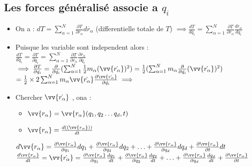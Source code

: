 \documentclass[12pt,oneside]{book}
\begin{document}
\subsection{Les forces généralisé associe a $q_i$}
\begin{small}
\begin{itemize}
	\item On a : $dT = \sum^N_{\alpha =1} \frac{\partial T}{\partial \dot{r_\alpha}}d\dot{r_\alpha}$ (differentielle totale de $T$)
	      $\implies \frac{dT}{d\dot{q_i}} = \sum^N_{\alpha =1} \frac{\partial T}{\partial \dot{r_\alpha}}\frac{d\dot{r_\alpha}}{d\dot{q_i}}$ \\
	\item Puisque les variable sont independent alors :\\
	      $ \frac{dT}{d\dot{q_i}}=\frac{\partial T}{\partial\dot{q_i}} = \sum^N_{\alpha =1} \frac{\partial T}{\partial \dot{r_\alpha}}\frac{\partial\dot{r_\alpha}}{\partial\dot{q_i}}$
	      $\implies \frac{\partial T}{\partial \dot{q_i}}=\frac{\partial}{\partial \dot{q_i}}(\sum^N_{\alpha =1} \frac{1}{2}m_\alpha(\vv{\dot{r_\alpha}})^2)= \frac{1}{2}(\sum^N_{\alpha =1} m_\alpha \frac{\partial}{\partial\dot{q_i}}(\vv{\dot{r_\alpha}})^2)$
	      \\ $= \frac{1}{2}\times 2 \sum^N_{\alpha =1} m_\alpha \vv{\dot{r_\alpha}}\frac{\partial \vv{\dot{r_\alpha}}}{\partial\dot{q_i}} \implies$ \\
	\item Chercher $\vv{\dot{r_\alpha}}$ , ona :
	      \begin{itemize}
		      \item $\vv{r_\alpha} = \vv{r_\alpha} (q_1,q_2\ldots q_d , t) $
		      \item $\vv{r_\alpha} = \frac{d((\vv{r_\alpha}))}{dt}$
	      \end{itemize}
	      $d\vv{r_\alpha} = \frac{\partial\vv{r_\alpha}}{\partial q_1}dq_1+\frac{\partial\vv{r_\alpha}}{\partial q_2}dq_2 + \ldots +\frac{\partial\vv{r_\alpha}}{\partial q_d}dq_d+\frac{\partial\vv{r_\alpha}}{\partial t}dt$ \\
	      $\frac{d\vv{r_\alpha}}{dt} =\vv{\dot{r_\alpha}}= \frac{\partial\vv{r_\alpha}}{\partial q_1}\frac{dq_1}{dt}+\frac{\partial\vv{r_\alpha}}{\partial q_2}\frac{dq_2}{dt} + \ldots +\frac{\partial\vv{r_\alpha}}{\partial q_d}\frac{dq_d}{dt}+\frac{\partial\vv{r_\alpha}}{\partial t}$ \\

\end{itemize}
\end{small}
\end{document}
